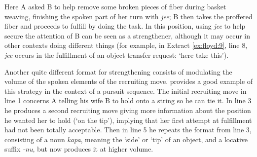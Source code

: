 \documentclass[output=paper]{langsci/langscibook}
\begin{document}
Here A asked B to help remove some broken pieces of fiber during basket weaving, finishing the spoken part of her turn with \textit{jee}; B then takes the proffered fiber and proceeds to fulfill by doing the task. In this position, using \textit{jee} to help secure the attention of B can be seen as a strengthener, although it may occur in other contexts doing different things (for example, in Extract \ref{ex:floyd:9}, line 8, \textit{jee} occurs in the fulfillment of an object transfer request: ‘here take this’).

Another quite different format for strengthening consists of modulating the volume of the spoken elements of the recruiting move.  provides a good example of this strategy in the context of a pursuit sequence. The initial recruiting move in line 1 concerns A telling his wife B to hold onto a string so he can tie it. In line 3 he produces a second recruiting move giving more information about the position he wanted her to hold (‘on the tip’), implying that her first attempt at fulfillment had not been totally acceptable. Then in line 5 he repeats the format from line 3, consisting of a noun \textit{kapa}, meaning the ‘side’ or ‘tip’ of an object, and a locative suffix \textit{{}-nu}, but now produces it at higher volume.
\end{document}
